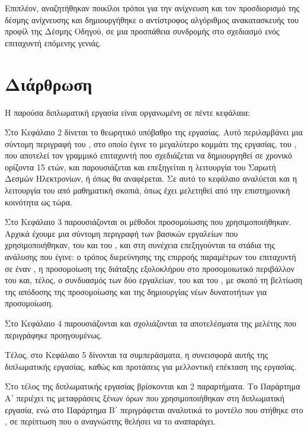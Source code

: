 Επιπλέον, αναζητήθηκαν ποικίλοι τρόποι για την ανίχνευση και τον προσδιορισμό της δέσμης ανίχνευσης και δημιουργήθηκε ο αντίστροφος αλγόριθμος ανακατασκευής του προφίλ της Δέσμης Οδηγού, σε μια προσπάθεια συνδρομής στο σχεδιασμό ενός επιταχυντή επόμενης γενιάς.

\section{Διάρθρωση}
Η παρούσα διπλωματική εργασία είναι οργανωμένη σε πέντε κεφάλαια:

Στο Κεφάλαιο 2 δίνεται το θεωρητικό υπόβαθρο της εργασίας. 
Αυτό περιλαμβάνει μια σύντομη περιγραφή του , στο οποίο έγινε το μεγαλύτερο κομμάτι της εργασίας, του , που αποτελεί τον γραμμικό επιταχυντή που σχεδιάζεται να δημιουργηθεί σε χρονικό ορίζοντα 15 ετών, και παρουσιάζεται και επεξηγείται η λειτουργία του Σαρωτή Δεσμών Ηλεκτρονίων, ή  όπως θα αναφέρεται.
Σε αυτό το κεφάλαιο αναλύεται και η λειτουργία του  από μαθηματική σκοπιά, όπως έχει μελετηθεί από την επιστημονική κοινότητα ως τώρα.

Στο Κεφάλαιο 3 παρουσιάζονται οι μέθοδοι προσομοίωσης που χρησιμοποιήθηκαν.
Αρχικά έχουμε μια σύντομη περιγραφή των βασικών εργαλείων που χρησιμοποιήθηκαν, του  και του , και στη συνέχεια επεξηγούνται τα στάδια της ανάλυσης που έγινε: ο τρόπος διερεύνησης της επιρροής παραμέτρων του επιταχυντή σε έναν , η προσομοίωση της διάταξης εξολοκλήρου στο προσομοιωτικό περιβάλλον του  και, τέλος, ο συνδυασμός των δύο εργαλείων, του  και του , με σκοπό τη βελτίωση της απόδοσης της προσομοίωσης και της δημιουργίας νέων δυνατοτήτων για προσομοίωση.

Στο Κεφάλαιο 4 παρουσιάζονται και σχολιάζονται τα αποτελέσματα της μελέτης που περιγράφηκε προηγουμένως.

Τέλος, στο Κεφάλαιο 5 δίνονται τα συμπεράσματα, η συνεισφορά αυτής της
διπλωματικής εργασίας, καθώς και προτάσεις για μελλοντική επέκταση της εργασίας.

Στο τέλος της διπλωματικής εργασίας βρίσκονται και 2 παραρτήματα.
Το Παράρτημα Α΄ περιέχει τις μεταφράσεις ξένων όρων που χρησιμοποιήθηκαν στη διπλωματική εργασία, ενώ στο Παράρτημα Β΄ περιγράφεται αναλυτικά το μοντέλο που στήθηκε στο , σε περίπτωση που ο αναγνώστης θελήσει να το αναπαράγει.